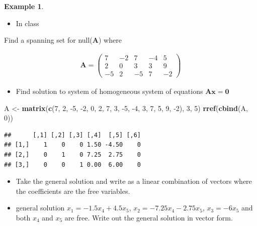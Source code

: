\documentclass[
]{book}
\newenvironment{Shaded}{\begin{snugshade}}{\end{snugshade}}
\newcommand{\DecValTok}[1]{\textcolor[rgb]{0.00,0.00,0.81}{#1}}
\newcommand{\KeywordTok}[1]{\textcolor[rgb]{0.13,0.29,0.53}{\textbf{#1}}}
\newcommand{\NormalTok}[1]{#1}
\newcommand{\StringTok}[1]{\textcolor[rgb]{0.31,0.60,0.02}{#1}}
\providecommand{\tightlist}{%
  \setlength{\itemsep}{0pt}\setlength{\parskip}{0pt}}
\theoremstyle{definition}
\theoremstyle{definition}
\newtheorem{example}{Example}[chapter]
\theoremstyle{definition}
\theoremstyle{definition}
\theoremstyle{remark}
\begin{document}
\begin{example}

\begin{itemize}
\tightlist
\item
  In class
\end{itemize}

Find a spanning set for null(\(\mathbf{A}\)) where

\[
\begin{aligned}
\mathbf{A} = \begin{pmatrix} 7 & -2 & 7 & -4 & 5 \\ 2 & 0 & 3 & 3 & 9 \\ -5 & 2 & -5 & 7 & -2 \end{pmatrix}
\end{aligned}
\]

\begin{itemize}
\tightlist
\item
  Find solution to system of homogeneous system of equations \(\mathbf{A} \mathbf{x} = \mathbf{0}\)
\end{itemize}

\begin{Shaded}
\begin{Highlighting}[]
\NormalTok{A <-}\StringTok{ }\KeywordTok{matrix}\NormalTok{(}\KeywordTok{c}\NormalTok{(}\DecValTok{7}\NormalTok{, }\DecValTok{2}\NormalTok{, }\DecValTok{-5}\NormalTok{, }\DecValTok{-2}\NormalTok{, }\DecValTok{0}\NormalTok{, }\DecValTok{2}\NormalTok{, }\DecValTok{7}\NormalTok{, }\DecValTok{3}\NormalTok{, }\DecValTok{-5}\NormalTok{, }\DecValTok{-4}\NormalTok{, }\DecValTok{3}\NormalTok{, }\DecValTok{7}\NormalTok{, }\DecValTok{5}\NormalTok{, }\DecValTok{9}\NormalTok{, }\DecValTok{-2}\NormalTok{), }\DecValTok{3}\NormalTok{, }\DecValTok{5}\NormalTok{)}
\KeywordTok{rref}\NormalTok{(}\KeywordTok{cbind}\NormalTok{(A, }\DecValTok{0}\NormalTok{))}
\end{Highlighting}
\end{Shaded}

\begin{verbatim}
##      [,1] [,2] [,3] [,4]  [,5] [,6]
## [1,]    1    0    0 1.50 -4.50    0
## [2,]    0    1    0 7.25  2.75    0
## [3,]    0    0    1 0.00  6.00    0
\end{verbatim}

\begin{itemize}
\item
  Take the general solution and write as a linear combination of vectors where the coefficients are the free variables.
\item
  general solution \(x_1 = -1.5 x_4 + 4.5 x_5\), \(x_2 = -7.25 x_4 - 2.75 x_5\), \(x_3 = -6 x_5\) and both \(x_4\) and \(x_5\) are free. Write out the general solution in vector form.
\end{itemize}


\end{example}
\end{document}
